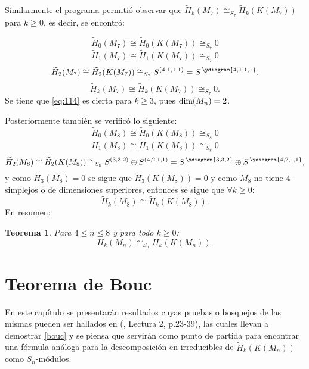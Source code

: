 \documentclass[12pt]{book}
\newtheorem{theorem}{Teorema}[section]
\theoremstyle{definition}
\newcounter{in}
\begin{document}
Similarmente el programa permitió observar que $\widetilde H_{k}(M_{7})\cong_{S_7} \widetilde H_{k}(K(M_{7}))$ para $k\geq0$, es decir, se encontró:

\begin{equation}
  \widetilde H_{0}(M_{7})\cong\widetilde H_{0}(K(M_{7}))\cong_{S_{7}} 0
\end{equation}
\begin{equation}
  \widetilde H_{1}(M_{7})\cong\widetilde H_{1}(K(M_{7}))\cong_{S_{7}} 0
\end{equation}
\begin{equation}
  \widetilde H_{2}(M_{7})\cong\widetilde H_{2}(K(M_{7}))\cong_{S_{7}} S^{(4,1,1,1)} = S^{\,\ydiagram{4,1,1,1}}.
\end{equation}
\begin{equation}
\label{eq:114}
  \widetilde H_{k}(M_{7})\cong\widetilde H_{k}(K(M_{7}))\cong_{S_{7}} 0.
\end{equation}
Se tiene que \ref{eq:114} es cierta para $k \geq 3$, pues $\textup{dim}(M_n) = 2$.

Posteriormente también se verificó lo siguiente:
\begin{equation}
  \widetilde H_{0}(M_{8})\cong\widetilde H_{0}(K(M_{8}))\cong_{S_{8}} 0
\end{equation}
\begin{equation}
  \widetilde H_{1}(M_{8})\cong\widetilde H_{1}(K(M_{8}))\cong_{S_{8}} 0
\end{equation}
\begin{equation}
  \widetilde H_{2}(M_{8})\cong\widetilde H_{2}(K(M_{8}))\cong_{S_{8}} S^{(3,3,2)} \oplus S^{(4,2,1,1)} = S^{\,\ydiagram{3,3,2}} \oplus S^{\,\ydiagram{4,2,1,1}},
\end{equation}
y como $\widetilde H_{3}(M_{8}) = 0$ se sigue que $\widetilde H_{3}(K(M_{8})) = 0$ y como $M_{8}$ no tiene $4$-simplejos o de dimensiones superiores, entonces se sigue que $\forall k \geq 0$:
\begin{equation}
  \widetilde H_{k}(M_{8})\cong\widetilde H_{k}(K(M_{8})).
\end{equation}
En resumen:
\begin{theorem}
Para $4 \leq n \leq 8$ y para todo $k \geq 0$:
\begin{equation*}
H_{k}(M_{n}) \cong_{S_{n}} H_{k}(K(M_n)).
\end{equation*}
\end{theorem}
\chapter{Teorema de Bouc}
\label{summ}
En este capítulo se presentarán resultados cuyas pruebas o bosquejos
de las mismas pueden ser hallados en \normalfont(\cite{wachs2006poset},
Lectura 2, p.23-39), las cuales llevan a demostrar \ref{bouc} y se
piensa que servirán como punto de partida para encontrar una fórmula
análoga para la descomposición en irreducibles de
$\widetilde H_k(K(M_n))$ como $S_n$-módulos.
\end{document}
